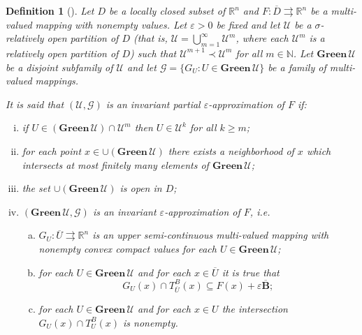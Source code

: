 \documentclass[a4paper]{article}
\newtheorem{definition}[thm]{Definition}
\begin{document}
\begin{definition}[\cite{KR}]\label{invpapr}
    Let $D$ be a locally closed subset of $\mathbb{R}^n$ and $F: \overline{D} \rightrightarrows \mathbb{R}^n$ be a multi-valued mapping with nonempty values. Let $\varepsilon>0$ be fixed and let $\mathcal{U}$ be a $\sigma$-relatively open partition of $D$ (that is, $\mathcal{U}=\bigcup_{m=1}^{\infty} \mathcal{U}^m$, where each $\mathcal{U}^m$ is a relatively open partition of $D$) such that $\mathcal{U}^{m+1} \prec \mathcal{U}^m$ for all $m \in \mathbb{N}$. Let $\mathbf{Green} \, \mathcal{U}$ be a disjoint subfamily of $\mathcal{U}$ and let $\mathcal{G} = \{G_U : U \in \mathbf{Green} \, \mathcal{U}\}$ be a family of multi-valued mappings.

    It is said that $(\mathcal{U},\mathcal{G})$ is an invariant partial $\varepsilon$-approximation of $F$ if:
    \begin{enumerate}[(i)]
        \item if $U \in (\mathbf{Green} \, \mathcal{U}) \cap \mathcal{U}^m$ then $U \in \mathcal{U}^k$ for all $k \ge m$;
        \item for each point $x \in \cup (\mathbf{Green} \, \mathcal{U})$ there exists a neighborhood of $x$ which intersects at most finitely many elements of $\mathbf{Green} \, \mathcal{U}$;
        \item the set $\cup (\mathbf{Green} \, \mathcal{U})$ is open in $D$;
        \item $(\mathbf{Green} \, \mathcal{U}, \mathcal{G})$ is an invariant $\varepsilon$-approximation of $F$, i.e.
        \begin{enumerate}[(a)]
            \item $G_U : \overline{U} \rightrightarrows \mathbb{R}^n$ is an upper semi-continuous multi-valued mapping with nonempty convex compact values for each $U \in \mathbf{Green} \, \mathcal{U}$;
            \item for each $U  \in \mathbf{Green} \, \mathcal{U}  $ and for each $x \in \overline{U} $ it is true that  $$G_{U}(x) \cap T^B_{\overline{U}}(x) \subseteq F(x) + \varepsilon\overline{\mathbf{B}};$$
            \item for each $U  \in \mathbf{Green} \, \mathcal{U}  $ and for each $x \in U$ the intersection $G_{U}(x) \cap T^B_{U}(x)$ is nonempty.
            \end{enumerate}
    \end{enumerate}
\end{definition}
\end{document}
